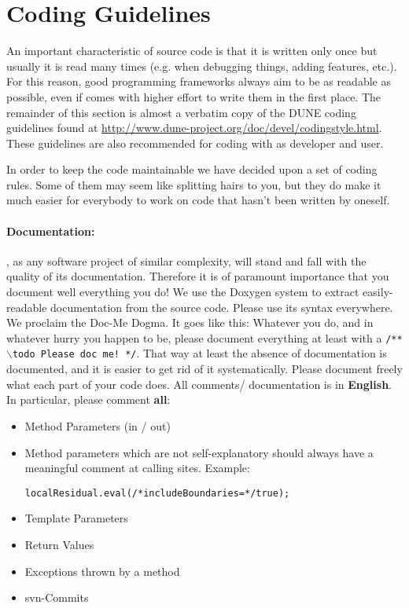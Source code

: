 \section{Coding Guidelines} 
\label{guidelines}

An important characteristic of source code is that it is written only
once but usually it is read many times (e.g. when debugging things,
adding features, etc.). For this reason, good programming frameworks
always aim to be as readable as possible, even if comes with higher
effort to write them in the first place. The remainder of this section
is almost a verbatim copy of the DUNE coding guidelines found at
\url{http://www.dune-project.org/doc/devel/codingstyle.html}. These guidelines
are also recommended for coding with \Dumux as developer and user.

In order to keep the code maintainable we have decided upon a set of
coding rules.  Some of them may seem like splitting hairs to you, but
they do make it much easier for everybody to work on code that hasn't
been written by oneself.


\paragraph{Documentation:}
\Dumux, as any software project of similar complexity, will stand and fall
with the quality of its documentation.
Therefore it is of paramount importance that you document well everything you
do! We use the Doxygen system to extract easily-readable documentation from the
source code. Please use its syntax everywhere.\\
We proclaim the Doc-Me Dogma. It goes like this: Whatever you do, and in whatever hurry you 
happen to be, please document everything at least with a \texttt{/** $\backslash$todo Please doc me! */}.
That way at least the absence of documentation is documented, and it is easier
to get rid of it systematically.
Please document freely what each part of your code does. All comments/ documentation
is in \textbf{English}. In particular, please comment \textbf{all}:
\begin{itemize}
  \item Method Parameters (in / out)
  \item Method parameters which are not self-explanatory should always
        have a meaningful comment at calling sites. Example:
  \begin{lstlisting}[style=DumuxCode]
    localResidual.eval(/*includeBoundaries=*/true);
  \end{lstlisting}
  \item Template Parameters
  \item Return Values 
  \item Exceptions thrown by a method
  \item svn-Commits
\end{itemize}


